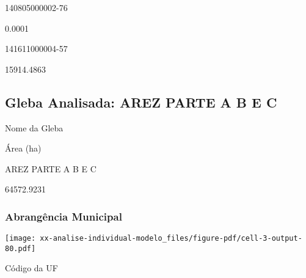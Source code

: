 \documentclass[
  11pt,
  a4paper,
  DIV=11,
  numbers=noendperiod]{scrartcl}
\begin{document}
\n    

\n  

\n  

\n    

\n      

140805000002-76

\n      

0.0001

\n    

\n    

\n      

141611000004-57

\n      

15914.4863

\n    

\n  

\n

\subsection{Gleba Analisada: AREZ PARTE A B E
C}\label{gleba-analisada-arez-parte-a-b-e-c}

\n  

\n    

\n      

Nome da Gleba

\n      

Área (ha)

\n    

\n  

\n  

\n    

\n      

AREZ PARTE A B E C

\n      

64572.9231

\n    

\n  

\n

\subsubsection{Abrangência Municipal}\label{abranguxeancia-municipal-4}

\texttt{[image: xx-analise-individual-modelo\_files/figure-pdf/cell-3-output-80.pdf]}

\n  

\n    

\n      

Código da UF

\n      
\end{document}
